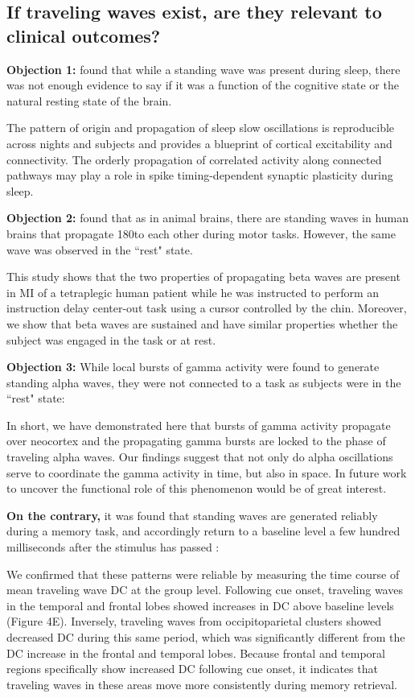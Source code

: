 \subsection{If traveling waves exist, are they relevant to clinical outcomes?}
\textbf{Objection 1:} \cite{Massimini6862} found that while a standing wave was present during sleep, there was not enough evidence to say if it was a function of the cognitive state or the natural resting state of the brain.
\begin{displayquote}
The pattern of origin and propagation of sleep slow oscillations is reproducible across nights and subjects and provides a blueprint of cortical excitability and connectivity. The orderly propagation of correlated activity along connected pathways may play a role in spike timing-dependent synaptic plasticity during sleep.
\end{displayquote}
\textbf{Objection 2:} \cite{Takahashi0} found that as in animal brains, there are standing waves in human brains that propagate 180\degree to each other during motor tasks. However, the same wave was observed in the ``rest" state.
\begin{displayquote}
This study shows that the two properties of propagating beta waves are present in MI of a tetraplegic human patient while he was instructed to perform an instruction delay center-out task using a cursor controlled by the chin. Moreover, we show that beta waves are sustained and have similar properties whether the subject was engaged in the task or at rest.
\end{displayquote}
\textbf{Objection 3:} While local bursts of gamma activity were found to generate standing alpha waves, they were not connected to a task as subjects were in the ``rest" state\cite{Bahramisharif18849}:
\begin{displayquote}
In short, we have demonstrated here that bursts of gamma activity propagate over neocortex and the propagating gamma bursts are locked to the phase of traveling alpha waves. Our findings suggest that not only do alpha oscillations serve to coordinate the gamma activity in time, but also in space. In future work to uncover the functional role of this phenomenon would be of great interest.
\end{displayquote}
\textbf{On the contrary,} it was found that standing waves are generated reliably during a memory task, and accordingly return to a baseline level a few hundred milliseconds after the stimulus has passed \cite{doi:10.1152/jn.00409.2005}:
\begin{displayquote}
We confirmed that these patterns were reliable by measuring the time course of mean traveling wave DC at the group level. Following cue onset, traveling waves in the temporal and frontal lobes showed increases in DC above baseline levels (Figure 4E). Inversely, traveling waves from occipitoparietal clusters showed decreased DC during this same period, which was significantly different from the DC increase in the frontal and temporal lobes. Because frontal and temporal regions specifically show increased DC following cue onset, it indicates that traveling waves in these areas move more consistently during memory retrieval.
\end{displayquote}
